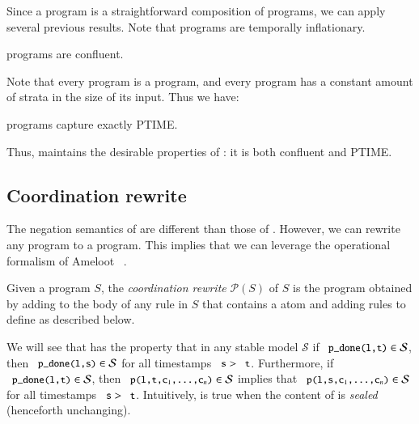 Since a \plang program is a straightforward composition of \slang programs, we can apply several previous results.  Note that \plang programs are temporally inflationary.

\begin{corollary}
\label{cor:plang-confluent}
\plang programs are confluent.
\end{corollary}

Note that every \slang program is a \plang program, and every \plang program has a constant amount of strata in the size of its input.  Thus we have:

\begin{corollary}
\label{cor:plang-ptime}
\plang programs capture exactly PTIME.
\end{corollary}

Thus, \plang maintains the desirable properties of \slang: it is both confluent and PTIME.

\subsection{Coordination rewrite}

The negation semantics of \plang are different than those of \lang.  However, we can rewrite any \plang program to a \lang program.  This implies that we can leverage the operational formalism of Ameloot \etal~\cite{ameloot-operational}.

Given a \plang program $S$, the {\em coordination rewrite} $\mathcal{P}(S)$ of $S$ is
the \lang program obtained by adding  to the body of any rule
in $S$ that contains a  atom and adding rules to define
 as described below.

We will see that  has the
property that in any stable model $\mathcal{S}$ if $\dedalus{p_done(l,t)} \in
\mathcal{S}$, then $\dedalus{p_done(l,s)} \in \mathcal{S}$ for all timestamps
$\dedalus{s} > \dedalus{t}$.  Furthermore, if $\dedalus{p_done(l,t)} \in
\mathcal{S}$, then $\dedalus{p(l,t,c\sub{1},\ldots,c\sub{n})} \in \mathcal{S}$
implies that $\dedalus{p(l,s,c\sub{1},\ldots,c\sub{n})} \in \mathcal{S}$ for all
timestamps $\dedalus{s} > \dedalus{t}$.  Intuitively,  is true
when the content of  is {\em sealed} (henceforth unchanging).



